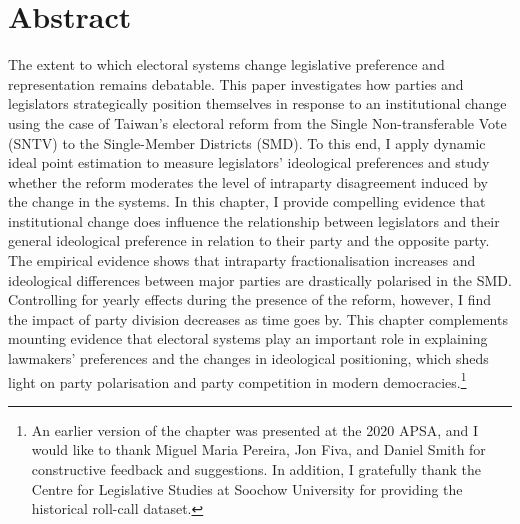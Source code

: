 
\section*{\centering Abstract}
\small The extent to which electoral systems change legislative preference and representation remains debatable. This paper investigates how parties and legislators strategically position themselves in response to an institutional change using the case of Taiwan's electoral reform from the Single Non-transferable Vote (SNTV) to the Single-Member Districts (SMD). To this end, I apply dynamic ideal point estimation to measure legislators' ideological preferences and study whether the reform moderates the level of intraparty disagreement induced by the change in the systems. In this chapter, I provide compelling evidence that institutional change does influence the relationship between legislators and their general ideological preference in relation to their party and the opposite party. The empirical evidence shows that intraparty fractionalisation increases and ideological differences between major parties are drastically polarised in the SMD. Controlling for yearly effects during the presence of the reform, however, I find the impact of party division decreases as time goes by. This chapter complements mounting evidence that electoral systems play an important role in explaining lawmakers' preferences and the changes in ideological positioning, which sheds light on party polarisation and party competition in modern democracies.\footnote{An earlier version of the chapter was presented at the 2020 APSA, and I would like to thank Miguel Maria Pereira, Jon Fiva, and Daniel Smith for constructive feedback and suggestions. In addition, I gratefully thank the Centre for Legislative Studies at Soochow University for providing the historical roll-call dataset.}

\clearpage


